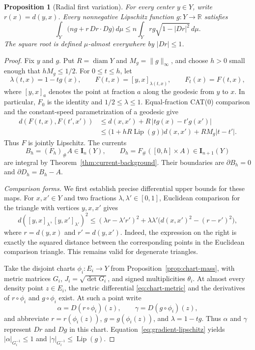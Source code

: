 \documentclass[11pt]{article}
\numberwithin{equation}{section}
\newtheorem{proposition}[theorem]{Proposition}
\theoremstyle{definition}
\theoremstyle{remark}
\begin{document}
\begin{proposition}[Radial first variation]
\label{prop:radial}
For every center $y\in Y$, write $r(x)=d(y,x)$.  Every nonnegative
Lipschitz function $g:Y\to\mathbb R$ satisfies
\begin{equation}
 \int_Y \bigl(ng+r\,Dr\cdot Dg\bigr)\,d\mu
 \leq n\int_Y rg\sqrt{1-|Dr|^2}\,d\mu.
 \label{eq:radial}
\end{equation}
The square root is defined $\mu$-almost everywhere by
$|Dr|\leq 1$.
\end{proposition}

\begin{proof}
Fix $y$ and $g$.  Put $R=\operatorname{diam} Y$ and $M_g=\|g\|_\infty$, and choose
$h>0$ small enough that $hM_g\leq 1/2$.  For $0\leq t\leq h$, let
\[
 \lambda(t,x)=1-tg(x),\qquad
 F(t,x)=[y,x]_{\lambda(t,x)},\qquad F_t(x)=F(t,x),
\]
where $[y,x]_a$ denotes the point at fraction $a$ along the geodesic
from $y$ to $x$.  In particular, $F_0$ is the identity and
$1/2\leq\lambda\leq1$.  Equal-fraction CAT(0) comparison and the
constant-speed parametrization of a geodesic give
\begin{align*}
 d(F(t,x),F(t',x'))
 &\leq d(x,x')+R\,|tg(x)-t'g(x')|\\
 &\leq \bigl(1+hR\operatorname{Lip}(g)\bigr)d(x,x')
       +RM_g|t-t'|.
\end{align*}
Thus $F$ is jointly Lipschitz.  The currents
\[
 B_h=(F_h)_\#A\in\mathbf I_n(Y),\qquad
 D_h=F_\#([0,h]\times A)\in\mathbf I_{n+1}(Y)
\]
are integral by Theorem~\ref{thm:current-background}.  Their boundaries
are $\partial B_h=0$ and $\partial D_h=B_h-A$.

\emph{Comparison forms.}
We first establish precise differential upper bounds for these maps.
For $x,x'\in Y$ and two fractions $\lambda,\lambda'\in[0,1]$, Euclidean
comparison for the triangle with vertices $y,x,x'$ gives
\begin{equation}
 d([y,x]_\lambda,[y,x']_{\lambda'})^2
 \leq (\lambda r-\lambda'r')^2
       +\lambda\lambda'\bigl(d(x,x')^2-(r-r')^2\bigr),
 \label{eq:radial-two-point}
\end{equation}
where $r=d(y,x)$ and $r'=d(y,x')$.  Indeed, the expression on the
right is exactly the squared distance between the corresponding
points in the Euclidean comparison triangle.  This remains valid for
degenerate triangles.

Take the disjoint charts $\phi_i:E_i\to Y$ from
Proposition~\ref{prop:chart-mass}, with metric matrices $G_i$,
$J_i=\sqrt{\det G_i}$, and signed multiplicities $\theta_i$.
At almost every density point $z\in E_i$, the metric differential
\eqref{eq:chart-metric} and the derivatives of $r\circ\phi_i$ and
$g\circ\phi_i$ exist.  At such a point write
\[
 \alpha=D(r\circ\phi_i)(z),\qquad
 \gamma=D(g\circ\phi_i)(z),
\]
and abbreviate $r=r(\phi_i(z))$, $g=g(\phi_i(z))$, and
$\lambda=1-tg$.  Thus $\alpha$ and $\gamma$ represent $Dr$ and $Dg$
in this chart.  Equation~\eqref{eq:gradient-lipschitz} yields
$|\alpha|_{G_i^{-1}}\leq1$ and
$|\gamma|_{G_i^{-1}}\leq\operatorname{Lip}(g)$.


\end{proof}
\end{document}
